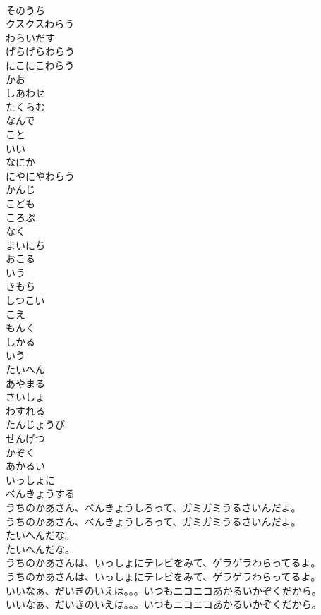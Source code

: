 \documentclass[8pt]{extreport}
\begin{document}
\begin{CJK}{UTF8}{min}
\\	そのうち
\\	クスクスわらう
\\	わらいだす
\\	げらげらわらう
\\	にこにこわらう
\\	かお
\\	しあわせ
\\	たくらむ
\\	なんで
\\	こと
\\	いい
\\	なにか
\\	にやにやわらう
\\	かんじ
\\	こども
\\	ころぶ
\\	なく
\\	まいにち
\\	おこる
\\	いう
\\	きもち
\\	しつこい
\\	こえ
\\	もんく
\\	しかる
\\	いう
\\	たいへん
\\	あやまる
\\	さいしょ
\\	わすれる
\\	たんじょうび
\\	せんげつ
\\	かぞく
\\	あかるい
\\	いっしょに
\\	べんきょうする
\\	うちのかあさん、べんきょうしろって、ガミガミうるさいんだよ。
\\	うちのかあさん、べんきょうしろって、ガミガミうるさいんだよ。
\\	たいへんだな。
\\	たいへんだな。
\\	うちのかあさんは、いっしょにテレビをみて、ゲラゲラわらってるよ。
\\	うちのかあさんは、いっしょにテレビをみて、ゲラゲラわらってるよ。
\\	いいなぁ、だいきのいえは。。。いつもニコニコあかるいかぞくだから。
\\	いいなぁ、だいきのいえは。。。いつもニコニコあかるいかぞくだから。

\end{CJK}
\end{document}
